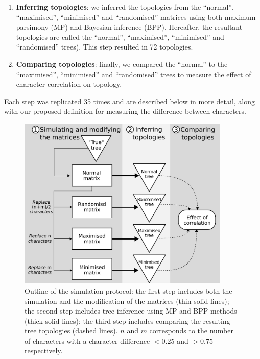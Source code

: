 \documentclass[12pt,letterpaper]{article}
\begin{document}
\begin{enumerate}
\item \textbf{Inferring topologies}: we inferred the topologies from the ``normal'', ``maximised'', ``minimised'' and ``randomised'' matrices using both maximum parsimony  (MP) and Bayesian inference (BPP). 
Hereafter, the resultant topologies are called the ``normal'', ``maximised'', ``minimised'' and ``randomised'' trees). This step resulted in 72 topologies.
    \item \textbf{Comparing topologies}: finally, we compared the ``normal'' to the ``maximised'', ``minimised'' and ``randomised'' trees to measure the effect of character correlation on topology.
\end{enumerate}
Each step was replicated 35 times and are described below in more detail, along with our proposed definition for measuring the difference between characters.

\begin{figure}[!htbp]
\centering
   \includegraphics[width=0.9\textwidth]{Figures/outline.pdf}
\caption{Outline of the simulation protocol: the first step includes both the simulation and the modification of the matrices (thin solid lines); the second step includes tree inference using MP and BPP methods (thick solid lines); the third step includes comparing the resulting tree topologies (dashed lines). $n$ and $m$ corresponds to the number of characters with a character difference $<0.25$ and $>0.75$ respectively.}
\label{Fig:outline}
\end{figure}
\end{document}
